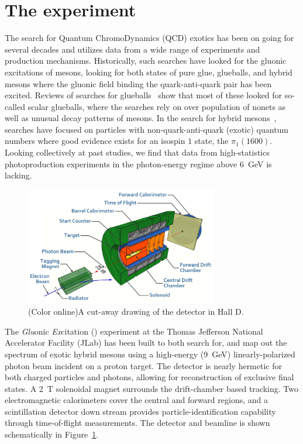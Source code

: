 \section[The \gx{} experiment]{\label{sec:gluexexperiment} The \gx{} experiment}
The search for Quantum ChromoDynamics (QCD) exotics has been on going for several decades and utilizes data from a wide range of experiments and production mechanisms. Historically, such searches have looked for the gluonic excitations of mesons, looking for both states of pure glue, glueballs, and hybrid mesons where the gluonic field binding the quark-anti-quark pair has been excited. Reviews of searches for glueballs~\cite{Crede:2008vw} show that most of these looked for so-called scalar glueballs, where the searches rely on over population of nonets as well as unusual decay patterns of mesons. In the search for hybrid mesons~\cite{Meyer:2010ku,Meyer:2015eta}, searches have focused on particles with non-quark-anti-quark (exotic) quantum numbers where good evidence exists for an isospin $1$ state, the $\pi_{1}(1600)$. Looking collectively at past studies, we find that data from high-statistics photoproduction experiments in the photon-energy regime above $6$~GeV is lacking. 

\begin{figure}[h!]\centering
\includegraphics[width=0.75\textwidth]{figures/GlueX-graphic.jpg}
\caption[]{\label{fig:gluex_cut-away}(Color online)A cut-away drawing of the \GX{} detector in Hall D.}
\end{figure}
The \emph{Glu}onic \emph{Ex}citation (\gx{}) experiment at the Thomas Jefferson National Accelerator Facility (JLab) \cite{jlab-ref} has been built to both search for, and map out the spectrum of exotic hybrid mesons using a high-energy (9~GeV) linearly-polarized photon beam incident on a proton target\cite{gluex-ref}. The detector is nearly hermetic for both charged particles and photons, allowing for reconstruction of exclusive final states. A 2~T solenoidal magnet surrounds the drift-chamber based tracking. Two electromagnetic calorimeters cover the central and forward regions, and a scintillation detector down stream provides particle-identification capability through time-of-flight measurements. The \gx{} detector and beamline is shown schematically in Figure~\ref{fig:gluex_cut-away}.


